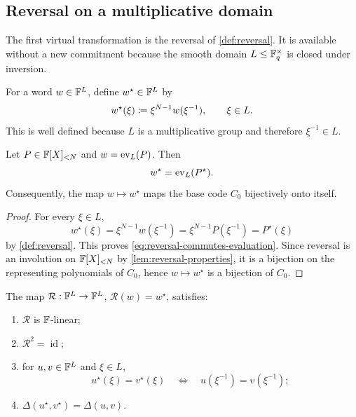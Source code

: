 \subsection{Reversal on a multiplicative domain}
\label{sec:virtual-reversal}

The first virtual transformation is the reversal of \cref{def:reversal}.  It is available without a new commitment because the smooth domain $L\le\mathbb{F}_q^\times$ is closed under inversion.

\begin{definition}
\label{def:virtual-reversal}
For a word $w\in\mathbb{F}^L$, define $w^{\star}\in\mathbb{F}^L$ by
\begin{equation}
  w^{\star}(\xi)
  \coloneqq
  \xi^{N-1}w(\xi^{-1}),
  \qquad \xi\in L.
  \label{eq:virtual-reversal}
\end{equation}
This is well defined because $L$ is a multiplicative group and therefore $\xi^{-1}\in L$.
\end{definition}

\begin{lemma}
\label{lem:reversal-commutes-evaluation}
Let $P\in\mathbb{F}[X]_{<N}$ and $w=\operatorname{ev}_L(P)$.  Then
\begin{equation}
  w^{\star}=\operatorname{ev}_L(P^{\star}).
  \label{eq:reversal-commutes-evaluation}
\end{equation}
Consequently, the map $w\mapsto w^{\star}$ maps the base code $C_0$ bijectively onto itself.
\end{lemma}

\begin{proof}
For every $\xi\in L$,
\[
  w^{\star}(\xi)
  =\xi^{N-1}w(\xi^{-1})
  =\xi^{N-1}P(\xi^{-1})
  =P^{\star}(\xi)
\]
by \cref{def:reversal}.  This proves \eqref{eq:reversal-commutes-evaluation}.  Since reversal is an involution on $\mathbb{F}[X]_{<N}$ by \cref{lem:reversal-properties}, it is a bijection on the representing polynomials of $C_0$, hence $w\mapsto w^{\star}$ is a bijection of $C_0$.
\end{proof}

\begin{lemma}
\label{lem:virtual-reversal-properties}
The map $\mathcal R:\mathbb{F}^L\to\mathbb{F}^L$, $\mathcal R(w)=w^{\star}$, satisfies:
\begin{enumerate}[label=(\arabic*),leftmargin=*]
  \item $\mathcal R$ is $\mathbb{F}$-linear;
  \item $\mathcal R^2=\operatorname{id}$;
  \item for $u,v\in\mathbb{F}^L$ and $\xi\in L$,
  \[
    u^{\star}(\xi)=v^{\star}(\xi)
    \quad\Longleftrightarrow\quad
    u(\xi^{-1})=v(\xi^{-1});
  \]
  \item $\Delta(u^{\star},v^{\star})=\Delta(u,v)$.
\end{enumerate}
\end{lemma}

